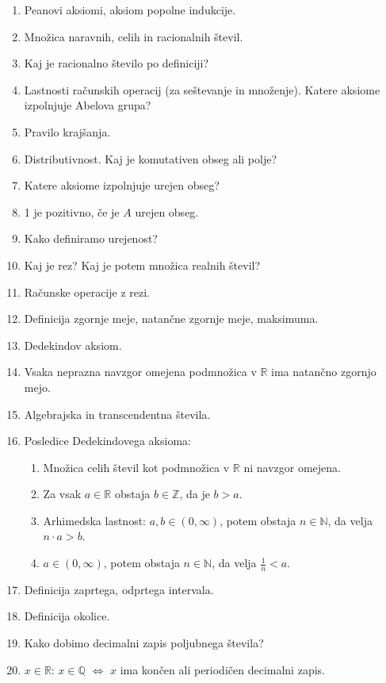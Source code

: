 \documentclass[a4paper,12pt]{report}
\begin{document}
\begin{enumerate}
    \item Peanovi aksiomi, aksiom popolne indukcije.
    \item Množica naravnih, celih in racionalnih števil.
    \item Kaj je racionalno število po definiciji?
    \item Lastnosti računskih operacij (za seštevanje in množenje). Katere aksiome izpolnjuje Abelova grupa?
    \item Pravilo krajšanja.
    \item Distributivnost. Kaj je komutativen obseg ali polje?
    \item Katere aksiome izpolnjuje urejen obseg?
    \item 1 je pozitivno, če je $A$ urejen obseg.
    \item Kako definiramo urejenost?
    \item Kaj je rez? Kaj je potem množica realnih števil?
    \item Računske operacije z rezi.
    \item Definicija zgornje meje, natančne zgornje meje, maksimuma.
    \item Dedekindov aksiom.
    \item Vsaka neprazna navzgor omejena podmnožica v $\mathbb{R}$ ima natančno zgornjo mejo.
    \item Algebrajska in transcendentna števila.
    \item Posledice Dedekindovega aksioma:
            \begin{enumerate}
                \item Množica celih števil kot podmnožica v $\mathbb{R}$ ni navzgor omejena.
                \item Za vsak $a \in \mathbb{R}$ obstaja $b \in \mathbb{Z}$, da je $b > a$.
                \item Arhimedska lastnost: $a, b \in (0, \infty)$, potem obstaja $n \in \mathbb{N}$, da velja $n \cdot a > b$.
                \item $a \in (0, \infty)$, potem obstaja $n \in \mathbb{N}$, da velja $\frac{1}{n} < a$.
            \end{enumerate}
    \item Definicija zaprtega, odprtega intervala.
    \item Definicija okolice.
    \item Kako dobimo decimalni zapis poljubnega števila?
    \item $x \in \mathbb{R}$: $x \in \mathbb{Q}$ $\iff$ $x$ ima končen ali periodičen decimalni zapis.

\end{enumerate}
\end{document}
